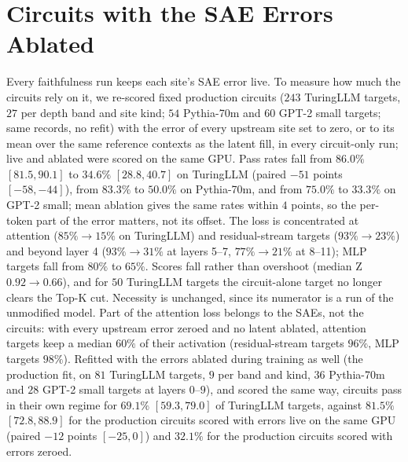 \documentclass[10pt]{article}
\begin{document}
\section{Circuits with the SAE Errors Ablated}
\label{app:error-ablation}
Every faithfulness run keeps each site's SAE error live.
To measure how much the circuits rely on it, we re-scored fixed production circuits ($243$ TuringLLM targets, $27$ per depth band and site kind; $54$ Pythia-70m and $60$ GPT-2 small targets; same records, no refit) with the error of every upstream site set to zero, or to its mean over the same reference contexts as the latent fill, in every circuit-only run; live and ablated were scored on the same GPU.
Pass rates fall from $86.0\%$ $[81.5, 90.1]$ to $34.6\%$ $[28.8, 40.7]$ on TuringLLM (paired $-51$ points $[-58, -44]$), from $83.3\%$ to $50.0\%$ on Pythia-70m, and from $75.0\%$ to $33.3\%$ on GPT-2 small; mean ablation gives the same rates within $4$ points, so the per-token part of the error matters, not its offset.
The loss is concentrated at attention ($85\% \to 15\%$ on TuringLLM) and residual-stream targets ($93\% \to 23\%$) and beyond layer 4 ($93\% \to 31\%$ at layers 5--7, $77\% \to 21\%$ at 8--11); MLP targets fall from $80\%$ to $65\%$.
Scores fall rather than overshoot (median Z $0.92 \to 0.66$), and for $50$ TuringLLM targets the circuit-alone target no longer clears the Top-K cut.
Necessity is unchanged, since its numerator is a run of the unmodified model.
Part of the attention loss belongs to the SAEs, not the circuits: with every upstream error zeroed and no latent ablated, attention targets keep a median $60\%$ of their activation (residual-stream targets $96\%$, MLP targets $98\%$).
Refitted with the errors ablated during training as well (the production fit, on $81$ TuringLLM targets, $9$ per band and kind, $36$ Pythia-70m and $28$ GPT-2 small targets at layers $0$--$9$), and scored the same way, circuits pass in their own regime for $69.1\%$ $[59.3, 79.0]$ of TuringLLM targets, against $81.5\%$ $[72.8, 88.9]$ for the production circuits scored with errors live on the same GPU (paired $-12$ points $[-25, 0]$) and $32.1\%$ for the production circuits scored with errors zeroed.
\end{document}
